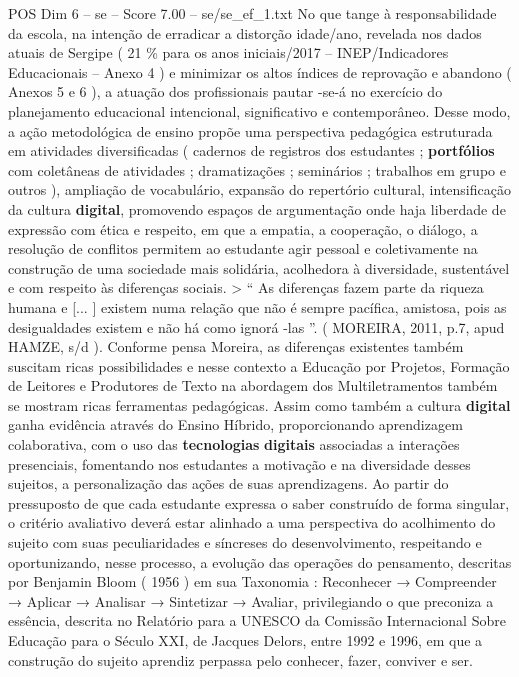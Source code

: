 \begin{textsample}{POS Dim 6 – se – Score 7.00 – se/se\_ef\_1.txt}
No que tange à responsabilidade da escola, na intenção de erradicar a distorção idade/ano, revelada nos dados atuais de Sergipe ( 21 \% para os anos iniciais/2017 – INEP/Indicadores Educacionais – Anexo 4 ) e minimizar os altos índices de reprovação e abandono ( Anexos 5 e 6 ), a atuação dos profissionais pautar -se-á no exercício do planejamento educacional intencional, significativo e contemporâneo.
Desse modo, a ação metodológica de ensino propõe uma perspectiva pedagógica estruturada em atividades diversificadas ( cadernos de registros dos estudantes ; \textbf{portfólios} com coletâneas de atividades ; dramatizações ; seminários ; trabalhos em grupo e outros ), ampliação de vocabulário, expansão do repertório cultural, intensificação da cultura \textbf{digital}, promovendo espaços de argumentação onde haja liberdade de expressão com ética e respeito, em que a empatia, a cooperação, o diálogo, a resolução de conflitos permitem ao estudante agir pessoal e coletivamente na construção de uma sociedade mais solidária, acolhedora à diversidade, sustentável e com respeito às diferenças sociais. > “ As diferenças fazem parte da riqueza humana e [... ] existem numa relação que não é sempre pacífica, amistosa, pois as desigualdades existem e não há como ignorá -las ”. ( MOREIRA, 2011, p.7, apud HAMZE, s/d ).
Conforme pensa Moreira, as diferenças existentes também suscitam ricas possibilidades e nesse contexto a Educação por Projetos, Formação de Leitores e Produtores de Texto na abordagem dos Multiletramentos também se mostram ricas ferramentas pedagógicas.
Assim como também a cultura \textbf{digital} ganha evidência através do Ensino Híbrido, proporcionando aprendizagem colaborativa, com o uso das \textbf{tecnologias} \textbf{digitais} associadas a interações presenciais, fomentando nos estudantes a motivação e na diversidade desses sujeitos, a personalização das ações de suas aprendizagens.
Ao partir do pressuposto de que cada estudante expressa o saber construído de forma singular, o critério avaliativo deverá estar alinhado a uma perspectiva do acolhimento do sujeito com suas peculiaridades e síncreses do desenvolvimento, respeitando e oportunizando, nesse processo, a evolução das operações do pensamento, descritas por Benjamin Bloom ( 1956 ) em sua Taxonomia : Reconhecer → Compreender → Aplicar → Analisar → Sintetizar → Avaliar, privilegiando o que preconiza a essência, descrita no Relatório para a UNESCO da Comissão Internacional Sobre Educação para o Século XXI, de Jacques Delors, entre 1992 e 1996, em que a construção do sujeito aprendiz perpassa pelo conhecer, fazer, conviver e ser.

\end{textsample}
